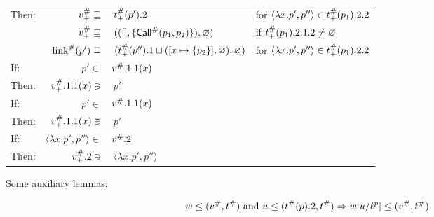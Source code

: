 \documentclass{article}
\begin{document}
\begin{center}
\begin{tabular}{|l@{\hskip2pt}r@{\hskip2pt}l@{\hskip2pt}l|}
		Then:           & ${v}^{\#}_+\sqsupseteq$                           & $\:{t}^{\#}_+(p').2$                                                              & for $\langle\lambda x.p',p''\rangle\in{t}^{\#}_+(p_1).2.2$ \\
		                & ${v}^{\#}_+\sqsupseteq$                           & $\:(([],\{{\textsf{Call}}^{\#}(p_1,p_2)\}),\varnothing)$                                      & if ${t}^{\#}_+(p_1).2.1.2\neq\varnothing$                  \\
		                & ${\text{link}}^{\#}(p')\sqsupseteq$                       & $\:({t}^{\#}_+(p'').1\sqcup([x\mapsto\{p_2\}],\varnothing),\varnothing)$          & for $\langle\lambda x.p',p''\rangle\in{t}^{\#}_+(p_1).2.2$ \\
		\hline
		If:             & $p'\in$                                          & ${v}^{\#}.1.1(x)$                                                                    &                                                              \\
		Then:           & ${v}^{\#}_+.1.1(x)\ni$                            & $\:p'$                                                                              &                                                              \\
		\hline
		If:             & $p'\in$                                          & ${v}^{\#}.1.1(x)$                                                                    &                                                              \\
		Then:           & ${v}^{\#}_+.1.1(x)\ni$                            & $\:p'$                                                                              &                                                              \\
		\hline
		If:             & $\langle\lambda x.p',p''\rangle\in$              & ${v}^{\#}.2$                                                                         &                                                              \\
		Then:           & ${v}^{\#}_+.2\ni$                                 & $\:\langle\lambda x.p',p''\rangle$                                                  &                                                              \\
		\hline
	\end{tabular}
\end{center}
Some auxiliary lemmas:
\begin{lem}
	\[w\le({v}^{\#},{t}^{\#})\text{ and }u\le({t}^{\#}(p).2,{t}^{\#})\Rightarrow w[u/{\ell}^{p}]\le({v}^{\#},{t}^{\#})\]
\end{lem}
\end{document}
